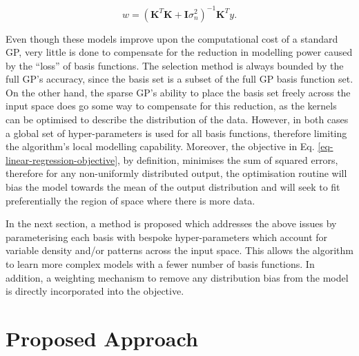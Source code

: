 \documentclass[useAMS,usenatbib,fleqn]{mn2e}
\newcommand{\bm}[1]{\mathbf{#1} }
\begin{document}
\begin{equation}
\label{eq-linear-regression-objective-rectangular}
w = \left(\bm{K}^{T}\bm{K}+\bm{I}\sigma_{n}^{2} \right)^{-1}\bm{K}^{T}y.
\end{equation}

Even though these models improve upon the computational cost of a standard GP, very little is done to compensate for the reduction in modelling power caused by the ``loss'' of basis functions. The selection method is always bounded by the full GP's accuracy, since the basis set is a subset of the full GP basis function set. On the other hand, the sparse GP's ability to place the basis set freely across the input space does go some way to compensate for this reduction, as the kernels can be optimised to describe the distribution of the data. However, in both cases a global set of hyper-parameters is used for all basis functions, therefore limiting the algorithm's local modelling capability. Moreover, the objective in Eq. \eqref{eq-linear-regression-objective}, by definition, minimises the sum of squared errors, therefore for any non-uniformly distributed output, the optimisation routine will bias the model towards the mean of the output distribution and will seek to fit preferentially the region of space where there is more data.

In the next section, a method is proposed which addresses the above issues by parameterising each basis with bespoke hyper-parameters which account for variable density and/or patterns across the input space. This allows the algorithm to learn more complex models with a fewer number of basis functions. In addition, a weighting mechanism to remove any distribution bias from the model is directly incorporated into the objective.

\section{Proposed Approach}
\label{sec-proposed-approach}
\end{document}
